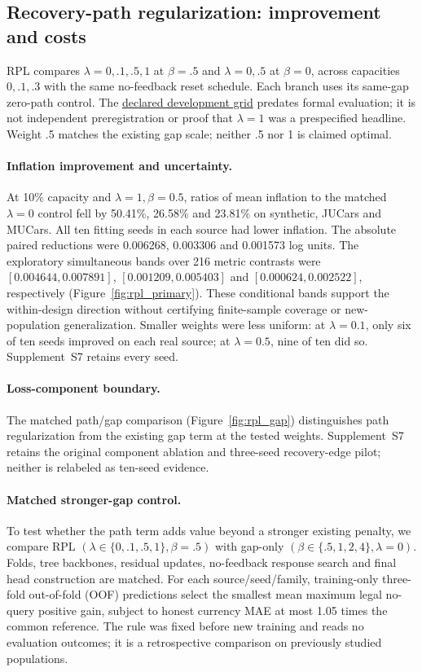 \documentclass[11pt]{article}
\begin{document}
\subsection{Recovery-path regularization: improvement and costs}\label{sec:rpl_results}
RPL compares $\lambda=0,.1,.5,1$ at $\beta=.5$ and
$\lambda=0,.5$ at $\beta=0$, across capacities $0,.1,.3$ with the same
no-feedback reset schedule. Each branch uses its same-gap zero-path control.
The \href{https://github.com/T0Q0R/secondhand-valuation-research/commit/6643cbe3266f2c1548d987c2bb53e366e19ad3ef}{declared development grid}
predates formal evaluation; it is not independent preregistration or proof
that $\lambda=1$ was a prespecified headline. Weight .5 matches the existing
gap scale; neither .5 nor 1 is claimed optimal.

\paragraph{Inflation improvement and uncertainty.}
At 10\% capacity and $\lambda=1,\beta=0.5$, ratios of mean inflation to the
matched $\lambda=0$ control fell by 50.41\%, 26.58\% and 23.81\% on synthetic,
JUCars and MUCars. All ten fitting seeds in each source had lower inflation.
The absolute paired reductions were 0.006268, 0.003306 and 0.001573 log units.
The exploratory simultaneous bands over 216 metric contrasts were
$[0.004644,0.007891]$, $[0.001209,0.005403]$ and
$[0.000624,0.002522]$, respectively (Figure~\ref{fig:rpl_primary}). These
conditional bands support the within-design direction without certifying
finite-sample coverage or new-population generalization. Smaller weights were
less uniform: at $\lambda=0.1$, only six of ten seeds improved on each real
source; at $\lambda=0.5$, nine of ten did so. Supplement~S7
retains every seed.

\paragraph{Loss-component boundary.}
The matched path/gap comparison (Figure~\ref{fig:rpl_gap}) distinguishes
path regularization from the existing gap term at the tested weights.
Supplement~S7 retains the original component ablation and
three-seed recovery-edge pilot; neither is relabeled as ten-seed evidence.

\paragraph{Matched stronger-gap control.}
To test whether the path term adds value beyond a stronger existing penalty,
we compare RPL $(\lambda\in\{0,.1,.5,1\},\beta=.5)$ with gap-only
$(\beta\in\{.5,1,2,4\},\lambda=0)$. Folds, tree backbones, residual updates,
no-feedback response search and final head construction are matched.
For each source/seed/family, training-only three-fold out-of-fold (OOF)
predictions select the smallest mean maximum legal no-query positive gain,
subject to honest currency MAE at most 1.05 times the common reference.
The rule was fixed before new training and reads no evaluation outcomes;
it is a retrospective comparison on previously studied populations.
\end{document}
